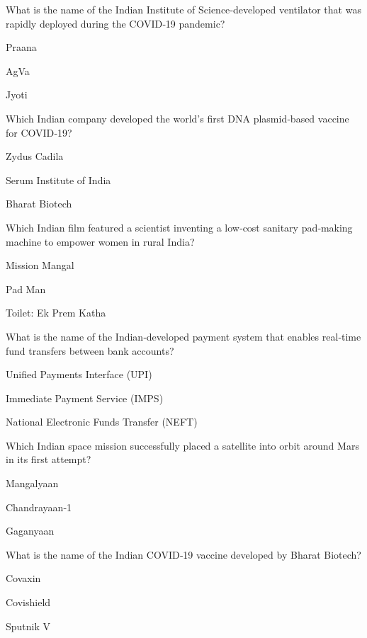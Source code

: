 \begin{enhancedmcq}{What is the name of the Indian Institute of Science‑developed ventilator that was rapidly deployed during the COVID‑19 pandemic?}
\item Praana
\item AgVa
\item Jyoti

\end{enhancedmcq}
\begin{enhancedmcq}{Which Indian company developed the world's first DNA plasmid‑based vaccine for COVID‑19?}
\item Zydus Cadila
\item Serum Institute of India
\item Bharat Biotech

\end{enhancedmcq}
\begin{enhancedmcq}{Which Indian film featured a scientist inventing a low‑cost sanitary pad‑making machine to empower women in rural India?}
\item Mission Mangal
\item Pad Man
\item Toilet: Ek Prem Katha

\end{enhancedmcq}
\begin{enhancedmcq}{What is the name of the Indian‑developed payment system that enables real‑time fund transfers between bank accounts?}
\item Unified Payments Interface (UPI)
\item Immediate Payment Service (IMPS)
\item National Electronic Funds Transfer (NEFT)

\end{enhancedmcq}
\begin{enhancedmcq}{Which Indian space mission successfully placed a satellite into orbit around Mars in its first attempt?}
\item Mangalyaan
\item Chandrayaan‑1
\item Gaganyaan

\end{enhancedmcq}
\begin{enhancedmcq}{What is the name of the Indian COVID‑19 vaccine developed by Bharat Biotech?}
\item Covaxin
\item Covishield
\item Sputnik V

\end{enhancedmcq}
